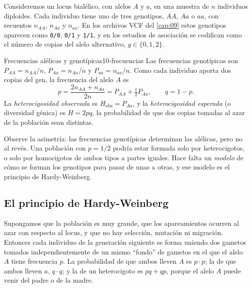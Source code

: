 Consideremos un locus bialélico, con alelos $A$ y $a$, en una muestra de $n$ individuos diploides. Cada individuo tiene uno de tres genotipos, $AA$, $Aa$ o $aa$, con recuentos $n_{AA}$, $n_{Aa}$ y $n_{aa}$. En los archivos VCF del \cref{cap:09} estos genotipos aparecen como \texttt{0/0}, \texttt{0/1} y \texttt{1/1}, y en los estudios de asociación se codifican como el número de copias del alelo alternativo, $g\in\{0,1,2\}$.

\begin{definicion}{Frecuencias alélicas y genotípicas}{10-frecuencias}
Las frecuencias genotípicas son $P_{AA}=n_{AA}/n$, $P_{Aa}=n_{Aa}/n$ y $P_{aa}=n_{aa}/n$. Como cada individuo aporta dos copias del gen, la frecuencia del alelo $A$ es
\begin{equation}\label{eq:10-frecalelica}
p = \frac{2n_{AA}+n_{Aa}}{2n} = P_{AA}+\tfrac12 P_{Aa},\qquad q = 1-p.
\end{equation}
La \emph{heterocigosidad observada} es $H_{\text{obs}}=P_{Aa}$, y la \emph{heterocigosidad esperada} (o diversidad génica) es $H=2pq$, la probabilidad de que dos copias tomadas al azar de la población sean distintas.
\end{definicion}

\begin{simbolos}
\end{simbolos}

Observe la asimetría: las frecuencias genotípicas determinan las alélicas, pero no al revés. Una población con $p=1/2$ podría estar formada solo por heterocigotos, o solo por homocigotos de ambos tipos a partes iguales. Hace falta un \emph{modelo} de cómo se forman los genotipos para pasar de unas a otras, y ese modelo es el principio de Hardy-Weinberg.

\subsection{El principio de Hardy-Weinberg}

Supongamos que la población es muy grande, que los apareamientos ocurren al azar con respecto al locus, y que no hay selección, mutación ni migración. Entonces cada individuo de la generación siguiente se forma uniendo dos gametos tomados independientemente de un mismo ``fondo'' de gametos en el que el alelo $A$ tiene frecuencia $p$. La probabilidad de que ambos lleven $A$ es $p\cdot p$; la de que ambos lleven $a$, $q\cdot q$; y la de un heterocigoto es $pq+qp$, porque el alelo $A$ puede venir del padre o de la madre.

